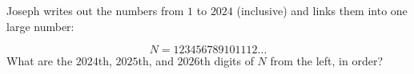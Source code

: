 Joseph writes out the numbers from $1$ to $2024$ (inclusive) and links them into one large number:

\[N = 123456789101112...\]What are the $2024$th, $2025$th, and $2026$th digits of $N$ from the left, in order?
